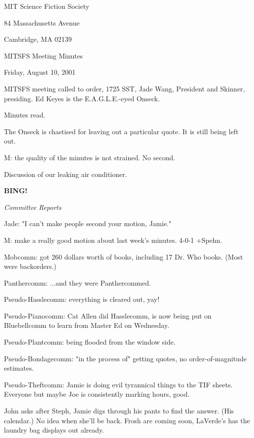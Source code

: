 \documentclass[12pt]{article}
\newcommand{\bing}{{\bf BING!} }
\newcommand{\goto}[1]{\bing \vskip 12pt \centerline{{\em{#1}}}}
\begin{document}
\begin{center}

MIT Science Fiction Society 

84 Massachusetts Avenue

Cambridge, MA 02139

\vspace{12pt}

MITSFS Meeting Minutes 

Friday, August 10, 2001

\end{center}
 
\vspace{18pt}

\setlength{\parskip}{6pt}

\noindent
MITSFS meeting called to order, 1725 SST, Jade Wang, President and
Skinner, presiding.  Ed Keyes is the E.A.G.L.E.-eyed Onseck.

Minutes read.

The Onseck is chastised for leaving out a particular quote. It is still being left out.

M: the quality of the minutes is not strained. No second.

Discussion of our leaking air conditioner.

\goto{Committee Reports}

Jade: "I can't make people second your motion, Jamie."

M: make a really good motion about last week's minutes. 4-0-1 +Spehn.

Mobcomm: got 260 dollars worth of books, including 17 Dr. Who books. (Most were backorders.)

Panthercomm: ...and they were Panthercommed.

Pseudo-Hasslecomm: everything is cleared out, yay!

Pseudo-Pianocomm: Cat Allen did Hasslecomm, is now being put on Bluebellcomm to learn from Master Ed on Wednesday.

Pseudo-Plantcomm: being flooded from the window side.

Pseudo-Bondagecomm: "in the process of" getting quotes, no order-of-magnitude estimates.

Pseudo-Theftcomm: Jamie is doing evil tyrannical things to the TIF sheets. Everyone but maybe Joe is consistently marking hours, good.

John asks after Steph, Jamie digs through his pants to find the answer. (His calendar.) No idea when she'll be back. Frosh are coming soon, LaVerde's has the laundry bag displays out already.
\end{document}
